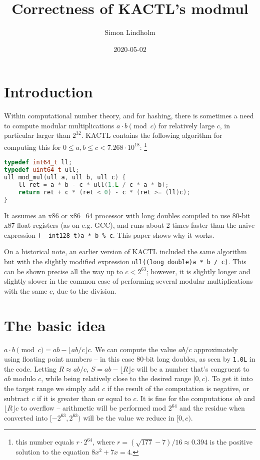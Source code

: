 \documentclass{article}
\title{Correctness of KACTL's modmul}
\author{Simon Lindholm}
\date{2020-05-02}
\begin{document}
\maketitle

\section{Introduction}

Within computational number theory, and for hashing, there is sometimes a need to compute modular multiplications $a \cdot b \pmod{c}$ for relatively large $c$, in particular larger than $2^{32}$. KACTL contains the following algorithm for computing this for $0 \le a, b \le c < 7.268\cdot 10^{18}$: \footnote{this number equals $r \cdot 2^{64}$, where $r = (\sqrt{177} - 7) / 16 \approx 0.394$ is the positive solution to the equation $8x^2 + 7x = 4$.}

\begin{lstlisting}[language=C++]
typedef int64_t ll;
typedef uint64_t ull;
ull mod_mul(ull a, ull b, ull c) {
    ll ret = a * b - c * ull(1.L / c * a * b);
    return ret + c * (ret < 0) - c * (ret >= (ll)c);
}
\end{lstlisting}

\noindent
It assumes an x86 or x86\_64 processor with long doubles compiled to use 80-bit x87 float registers (as on e.g. GCC),
and runs about 2 times faster than the naive expression \lstinline{(__int128_t)a * b % c}.
This paper shows why it works.

On a historical note, an earlier version of KACTL included the same algorithm but with the slightly modified expression \texttt{ull((long double)a * b / c)}. This can be shown precise all the way up to $c < 2^{63}$; however, it is slightly longer and slightly slower in the common case of performing several modular multiplications with the same $c$, due to the division.

\section{The basic idea}

$a \cdot b \pmod{c} = ab - \lfloor ab/c \rfloor c$. We can compute the value $ab/c$ approximately using floating point numbers -- in this case 80-bit long doubles, as seen by \texttt{1.0L} in the code. Letting $R \approx ab/c$, $S = ab - \lfloor R \rfloor c$ will be a number that's congruent to $ab$ modulo $c$, while being relatively close to the desired range $[0, c)$. To get it into the target range we simply add $c$ if the result of the computation is negative, or subtract $c$ if it is greater than or equal to $c$. It is fine for the computations $ab$ and $\lfloor R \rfloor c$ to overflow -- arithmetic will be performed mod $2^{64}$ and the residue when converted into $[-2^{63}, 2^{63})$ will be the value we reduce in $[0, c)$.
\end{document}
